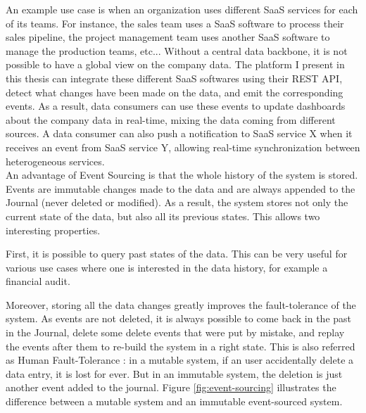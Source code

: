 An example use case is when an organization uses different SaaS services for each of its teams. For instance, the sales
team uses a SaaS software to process their sales pipeline, the project management team uses another SaaS software to manage
the production teams, etc... Without a central data backbone, it is not possible to have a global view on the company data.
The platform I present in this thesis can integrate these different SaaS softwares using their REST API, detect what
changes have been made on the data, and emit the corresponding events. As a result, data consumers can use these events
to update dashboards about the company data in real-time, mixing the data coming from different sources. A data consumer can also push a
notification to SaaS service X when it receives an event from SaaS service Y, allowing real-time synchronization between
heterogeneous services.
\\

An advantage of Event Sourcing is that the whole history of the system is stored. Events are immutable changes made to the data
and are always appended to the Journal (never deleted or modified). As a result, the system stores not only the current state
of the data, but also all its previous states. This allows two interesting properties.

First, it is possible to query past states of the data. This can be very useful for various use cases
where one is interested in the data history, for example a financial audit.

Moreover, storing all the data changes greatly improves the fault-tolerance of the system. As events are not deleted, it is always possible 
to come back in the past in the Journal, delete some delete events that were put by mistake, and replay the events after
them to re-build the system in a right state. This is also referred as Human Fault-Tolerance : in a mutable system,
if an user accidentally delete a data entry, it is lost for ever. But in an immutable system, the deletion is just another
event added to the journal. Figure \ref{fig:event-sourcing} illustrates the difference between a mutable system and an immutable event-sourced system.
\\ 

